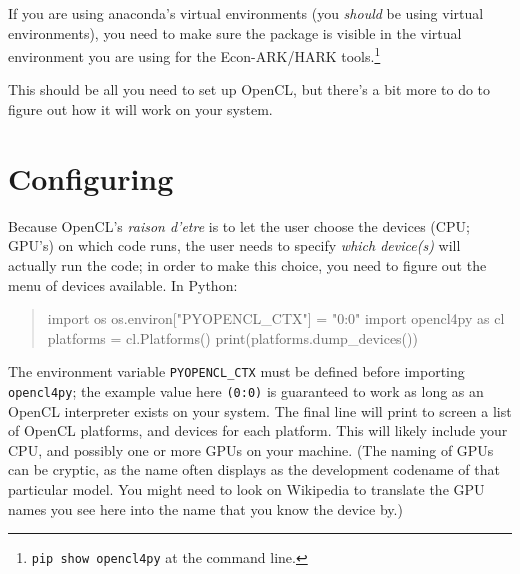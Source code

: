 \documentclass[12pt,pdftex,letterpaper]{article}
\begin{document}
If you are using anaconda's virtual environments (you {\it should} be using virtual environments), you need to make sure the package is visible in the virtual environment you are using for the Econ-ARK/HARK tools.\footnote{\texttt{pip show opencl4py} at the command line.}

This should be all you need to set up OpenCL, but there's a bit more to do to figure out how it will work on your system.

\section{Configuring \oclpy}

Because OpenCL's {\it raison d'etre} is to let the user choose the devices (CPU; GPU's) on which code runs, the user needs to specify \textit{which device(s)} will actually run the code; in order to make this choice, you need to figure out the menu of devices available.  In Python:
\begin{quote}
\begin{python}
import os
os.environ["PYOPENCL_CTX"] = "0:0"
import opencl4py as cl
platforms = cl.Platforms()
print(platforms.dump_devices())
\end{python}
\end{quote}

The environment variable \texttt{PYOPENCL\_CTX} must be defined before importing \texttt{opencl4py}; the example value here \texttt{(0:0)} is guaranteed to work as long as an OpenCL interpreter exists on your system.  The final line will print to screen a list of OpenCL platforms, and devices for each platform.  This will likely include your CPU, and possibly one or more GPUs on your machine.  (The naming of GPUs can be cryptic, as the name often displays as the development codename of that particular model.  You might need to look on Wikipedia to translate the GPU names you see here into the name that you know the device by.)
\end{document}
